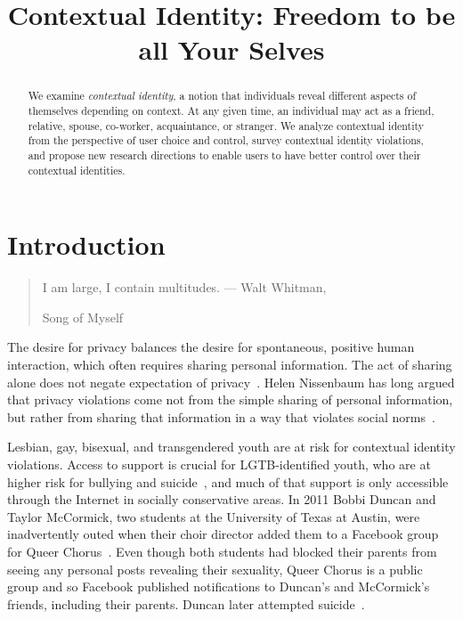 \documentclass[10pt, conference, compsocconf]{IEEEtran}
\begin{document}
\title{Contextual Identity: Freedom to be all Your Selves}

\author{
}
\maketitle

\begin{abstract}
We examine \textit{contextual identity}, a notion that individuals reveal
different aspects of themselves depending on context. At any given time,
an individual may act as a friend, relative, spouse, co-worker, acquaintance, or
stranger. We analyze contextual identity from the perspective of user choice
and control, survey contextual identity violations, and propose new research
directions to enable users to have better control over their contextual
identities.
\end{abstract}

\section{Introduction}
\begin{quote}I am large, I contain multitudes. --- Walt Whitman,
\begin{em}Song of Myself\end{em} \end{quote}

The desire for privacy balances the desire for spontaneous, positive human
interaction, which often requires sharing personal information. The act of
sharing alone does not negate expectation of privacy~\cite{boyd2}.
Helen Nissenbaum has long argued that privacy violations come not from the
simple sharing of personal information, but rather from sharing that
information in a way that violates social norms~\cite{nissenbaum}.

Lesbian, gay, bisexual, and transgendered youth are at risk for contextual
identity violations.  Access to support is crucial for LGTB-identified youth,
who are at higher risk for bullying and suicide~\cite{hrc}, and
much of that support is only accessible through the Internet in socially
conservative areas. In 2011 Bobbi Duncan and Taylor McCormick, two
students at the University of Texas at Austin, were inadvertently outed when
their choir director added them to a Facebook group for Queer
Chorus~\cite{fowler}. Even though both students had blocked their parents from
seeing any personal posts revealing their sexuality, Queer Chorus is a
public group and so Facebook published notifications to Duncan's and McCormick's
friends, including their parents. Duncan later attempted suicide~\cite{duncan}.
\end{document}
